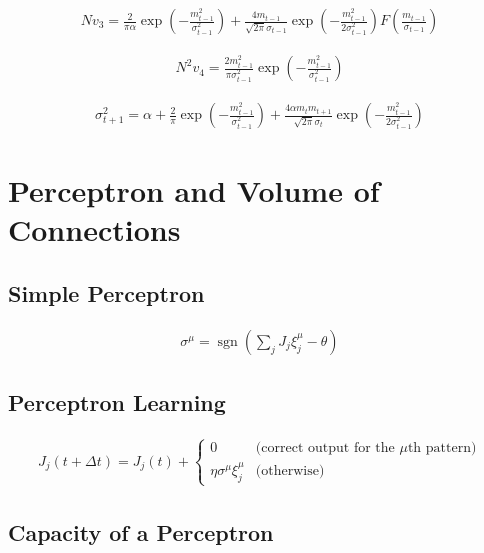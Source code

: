 \documentclass{article}
\begin{document}
\begin{align*}
N v_3 = \frac{2}{\pi \alpha} \exp\left( -\frac{m_{t-1}^2}{\sigma_{t-1}^2} \right) + \frac{4 m_{t-1}}{\sqrt{2 \pi} \sigma_{t-1}} \exp\left( -\frac{m_{t-1}^2}{2 \sigma_{t-1}^2} \right) F\left( \frac{m_{t-1}}{\sigma_{t-1}} \right)\tag{7.68}
\end{align*}

\begin{align*}
N^2 v_4 = \frac{2 m_{t-1}^2}{\pi \sigma_{t-1}^2} \exp\left( -\frac{m_{t-1}^2}{\sigma_{t-1}^2} \right)\tag{7.69}
\end{align*}

\begin{align*}
\sigma_{t+1}^2 = \alpha + \frac{2}{\pi} \exp\left( -\frac{m_{t-1}^2}{\sigma_{t-1}^2} \right) + \frac{4 \alpha m_t m_{t+1}}{\sqrt{2 \pi} \sigma_t} \exp\left( -\frac{m_{t-1}^2}{2 \sigma_{t-1}^2} \right)\tag{7.70}
\end{align*}

\clearpage

\section{Perceptron and Volume of Connections}

\subsection{Simple Perceptron}

\begin{align*}
\sigma^\mu = \operatorname{sgn}\left( \sum_j J_j \xi_j^\mu - \theta \right)\tag{7.71}
\end{align*}

\subsection{Perceptron Learning}

\begin{align*}
J_j(t + \Delta t) = J_j(t) + 
\begin{cases}
0 & \text{(correct output for the } \mu \text{th pattern)} \\
\eta \sigma^\mu \xi_j^\mu & \text{(otherwise)}
\end{cases}
\tag{7.72}
\end{align*}

\subsection{Capacity of a Perceptron}
\end{document}
